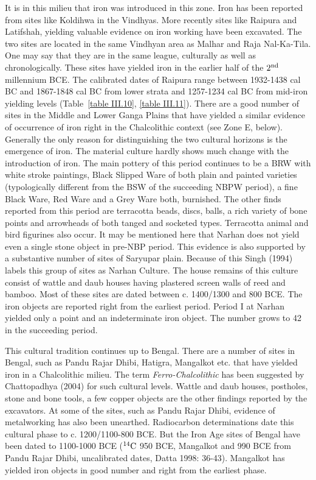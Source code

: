 It is in this milieu that iron was introduced in this zone. Iron has been reported from sites like Koldihwa in the Vindhyas. More recently sites like Raipura and Latifshah, yielding valuable evidence on iron working  have been excavated. The two sites are located in the same Vindhyan area as Malhar and Raja Nal-Ka-Tila. One may say that they are in the same league, culturally as well as chronologically. These sites have yielded iron in the earlier half of the $2^{\rm nd}$ millennium BCE. The calibrated dates of Raipura range between 1932-1438 cal BC and 1867-1848 cal BC from lower strata and 1257-1234 cal BC from mid-iron yielding levels (Table~\ref{table III.10}, \ref{table III.11}). There are a good number of sites in the Middle and Lower Ganga Plains that have yielded a similar evidence of occurrence of iron right in the Chalcolithic context (see Zone E, below). Generally the only reason for distinguishing the two cultural horizons is the emergence of iron. The material culture hardly shows much change with the introduction of iron. The main pottery of this period continues to be a BRW with white stroke paintings, Black Slipped Ware of both plain and painted varieties (typologically different from the BSW of the succeeding NBPW period), a fine Black Ware, Red Ware and a Grey Ware both, burnished.  The other finds reported from this period are terracotta beads, discs, balls, a rich variety of bone points and arrowheads of both tanged and socketed types. Terracotta animal and bird figurines also occur. It may be mentioned here that Narhan does not yield even a single stone object in pre-NBP period. This evidence is also supported by a substantive number of sites of Saryupar plain. Because of this Singh (1994) labels this group of sites as Narhan Culture. The house remains of this culture consist of wattle and daub houses having plastered screen walls of reed and bamboo. Most of these sites are dated between c. 1400/1300 and 800 BCE.  The iron objects are reported right from the earliest period. Period I at Narhan yielded only a point and an indeterminate iron object. The number grows to 42 in the succeeding period. 

This cultural tradition continues up to Bengal. There are a number of sites in Bengal, such as Pandu Rajar Dhibi, Hatigra, Mangalkot etc. that have yielded iron in a Chalcolithic milieu. The term \textit{Ferro-Chalcolithic} has been suggested by Chattopadhya (2004) for such cultural levels. Wattle and daub houses, postholes, stone and bone tools, a few copper objects are the other findings reported by the excavators. At some of the sites, such as Pandu Rajar Dhibi, evidence of metalworking has also been unearthed. Radiocarbon determinations date this cultural phase to c. 1200/1100-800 BCE. But the Iron Age sites of Bengal have been dated to 1100-1000 BCE ($^{14}{\rm C}$ 950 BCE, Mangalkot and 990 BCE from Pandu Rajar Dhibi, uncalibrated dates, Datta 1998: 36-43). Mangalkot has yielded iron objects in good number and right from the earliest phase. 

